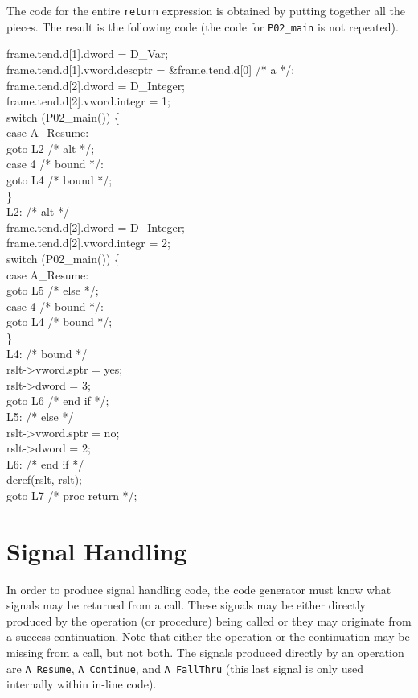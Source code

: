 The code for the entire \texttt{return} expression is obtained by putting
together all the pieces. The result is the following code (the code
for \texttt{P02\_main} is not repeated).

\goodbreak
\begin{iconcode}
frame.tend.d[1].dword = D\_Var;\\
frame.tend.d[1].vword.descptr = \&frame.tend.d[0] /* a */;\\
frame.tend.d[2].dword = D\_Integer;\\
frame.tend.d[2].vword.integr = 1;\\
switch (P02\_main()) \{\\
\>case A\_Resume:\\
\>\>goto L2 /* alt */;\\
\>case 4 /* bound */:\\
\>\>goto L4 /* bound */;\\
\>\}\\
L2: /* alt */\\
\>frame.tend.d[2].dword = D\_Integer;\\
\>frame.tend.d[2].vword.integr = 2;\\
\>switch (P02\_main()) \{\\
\>\>case A\_Resume:\\
\>\>\>goto L5 /* else */;\\
\>\>case 4 /* bound */:\\
\>\>\>goto L4 /* bound */;\\
\>\>\}\\
L4: /* bound */\\
\>rslt->vword.sptr = yes;\\
\>rslt->dword = 3;\\
\>goto L6 /* end if */;\\

L5: /* else */\\
\>rslt->vword.sptr = no;\\
\>rslt->dword = 2;\\
L6: /* end if */\\
\>deref(rslt, rslt);\\
\>goto L7 /* proc return */;\\
\end{iconcode}


\section{Signal Handling}

In order to produce signal handling code, the code generator must know
what signals may be returned from a call. These signals may be either
directly produced by the operation (or procedure) being called or they
may originate from a success continuation. Note that either the
operation or the continuation may be missing from a call, but not
both. The signals produced directly by an operation are
\texttt{A\_Resume}, \texttt{A\_Continue}, and \texttt{A\_FallThru}
(this last signal is only used internally within in-line code).

